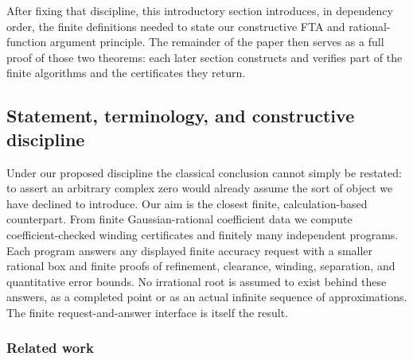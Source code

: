 \documentclass[11pt]{article}
\begin{document}
After fixing that discipline, this introductory section introduces, in
dependency order, the finite definitions needed to state our constructive
FTA and rational-function argument principle.  The remainder of the paper
then serves as a full proof of those two theorems: each later section
constructs and verifies part of the finite algorithms and the certificates
they return.

\subsection{Statement, terminology, and constructive discipline}

Under our proposed discipline the classical conclusion cannot simply be restated:
to assert an arbitrary complex zero would already assume the sort of object
we have declined to introduce.  Our aim is the closest finite,
calculation-based counterpart.  From finite Gaussian-rational coefficient
data we compute coefficient-checked winding certificates and finitely many
independent programs.  Each program answers any displayed finite accuracy
request with a smaller rational box and finite proofs of refinement,
clearance, winding, separation, and quantitative error bounds.  No
irrational root is assumed to exist behind these answers, as a completed
point or as an actual infinite sequence of approximations.  The finite
request-and-answer interface is itself the result.

\subsubsection{Related work}
\end{document}
